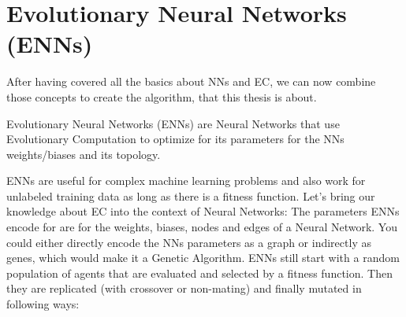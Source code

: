 \documentclass[11pt]{report}
\newcommand{\mydeflabel}{}
\newenvironment{mydef}[1]
 {\renewcommand\mydeflabel{#1}\begin{mydefinner}}
 {\end{mydefinner}}
\begin{document}
        \section{Evolutionary Neural Networks (ENNs)}\label{sec:evolutionary-neural-networks-(enns)}
    After having covered all the basics about NNs and EC, we can now combine those concepts to create the algorithm, that this thesis is about.
    \begin{mydef}{Evolutionary Neural Networks}
        Evolutionary Neural Networks (ENNs) are Neural Networks that use Evolutionary Computation to optimize for its parameters for the NNs weights/biases and its topology.
    \end{mydef}
    ENNs are useful for complex machine learning problems and also work for unlabeled training data as long as there is a fitness function.
    Let's bring our knowledge about EC into the context of Neural Networks:
    The parameters ENNs encode for are for the weights, biases, nodes and edges of a Neural Network.
    You could either directly encode the NNs parameters as a graph or indirectly as genes, which would make it a Genetic Algorithm.
    ENNs still start with a random population of agents that are evaluated and selected by a fitness function.
    Then they are replicated (with crossover or non-mating) and finally mutated in following ways:
\end{document}
